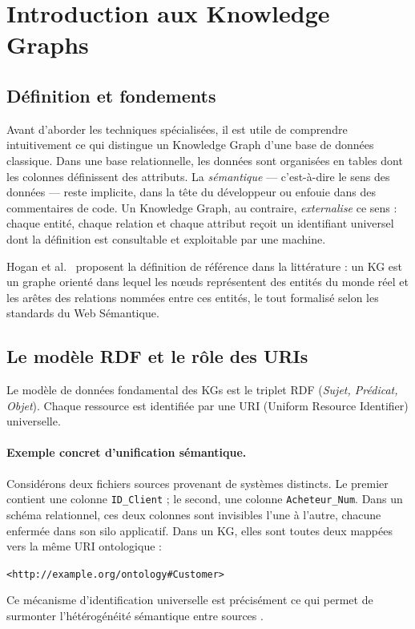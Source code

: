 \section{Introduction aux Knowledge Graphs}\label{sec:intro_kg}
\subsection{Définition et fondements}
Avant d'aborder les techniques spécialisées, il est utile de comprendre intuitivement ce qui distingue un Knowledge Graph d'une base de données classique. Dans une base relationnelle, les données sont organisées en tables dont les colonnes définissent des attributs. La \textit{sémantique} — c'est-à-dire le sens des données — reste implicite, dans la tête du développeur ou enfouie dans des commentaires de code. Un Knowledge Graph, au contraire, \textit{externalise} ce sens : chaque entité, chaque relation et chaque attribut reçoit un identifiant universel dont la définition est consultable et exploitable par une machine.

Hogan et al.~\cite{hogan2021knowledge} proposent la définition de référence dans la littérature : un KG est un graphe orienté dans lequel les nœuds représentent des entités du monde réel et les arêtes des relations nommées entre ces entités, le tout formalisé selon les standards du Web Sémantique.

\subsection{Le modèle RDF et le rôle des URIs}

Le modèle de données fondamental des KGs est le triplet RDF
(\textit{Sujet, Prédicat, Objet}).
Chaque ressource est identifiée par une URI
(Uniform Resource Identifier) universelle.

\paragraph{Exemple concret d'unification sémantique.}
Considérons deux fichiers sources provenant de systèmes distincts.
Le premier contient une colonne \texttt{ID\_Client} ; le second,
une colonne \texttt{Acheteur\_Num}. Dans un schéma relationnel,
ces deux colonnes sont invisibles l'une à l'autre, chacune enfermée
dans son silo applicatif. Dans un KG, elles sont toutes deux mappées
vers la même URI ontologique :
\begin{center}
\texttt{<http://example.org/ontology\#Customer>}
\end{center}
Ce mécanisme d'identification universelle est précisément ce qui
permet de surmonter l'hétérogénéité sémantique entre sources \cite{hogan2021knowledge}.

